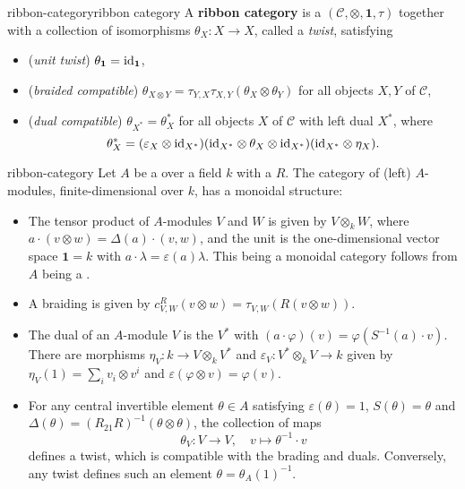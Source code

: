 \begin{topic}{ribbon-category}{ribbon category}
    A \textbf{ribbon category} is a   $(\mathcal{C}, \otimes, \textbf{1}, \tau)$ together with a collection of isomorphisms $\theta_X \colon X \to X$, called a \textit{twist}, satisfying
    \begin{itemize}
        \item (\textit{unit twist}) $\theta_\textbf{1} = \textup{id}_\textbf{1}$,
        \item (\textit{braided compatible}) $\theta_{X \otimes Y} = \tau_{Y, X} \tau_{X, Y} (\theta_X \otimes \theta_Y)$ for all objects $X, Y$ of $\mathcal{C}$,
        \item (\textit{dual compatible}) $\theta_{X^*} = \theta_X^*$ for all objects $X$ of $\mathcal{C}$ with left dual $X^*$, where
        \[ \theta_X^* = (\varepsilon_X \otimes \textup{id}_{X^*}) (\textup{id}_{X^*} \otimes \theta_X \otimes \textup{id}_{X^*}) (\textup{id}_{X^*} \otimes \eta_X) . \]
    \end{itemize}
\end{topic}

\begin{example}{ribbon-category}
    Let $A$ be a  over a field $k$ with a  $R$. The category of (left) $A$-modules, finite-dimensional over $k$, has a monoidal structure:
    \begin{itemize}
        \item The tensor product of $A$-modules $V$ and $W$ is given by $V \otimes_k W$, where $a \cdot (v \otimes w) = \Delta(a) \cdot (v, w)$, and the unit is the one-dimensional vector space $\textbf{1} = k$ with $a \cdot \lambda = \varepsilon(a) \lambda$. This being a monoidal category follows from $A$ being a .
        \item A braiding is given by $c_{V, W}^R(v \otimes w) = \tau_{V, W}(R (v \otimes w))$.
        \item The dual of an $A$-module $V$ is the  $V^*$ with $(a \cdot \varphi)(v) = \varphi(S^{-1}(a) \cdot v)$. There are morphisms $\eta_V \colon k \to V \otimes_k V^*$ and $\varepsilon_V \colon V^* \otimes_k V \to k$ given by $\eta_V(1) = \sum_i v_i \otimes v^i$ and $\varepsilon(\varphi \otimes v) = \varphi(v)$. 
        \item For any central invertible element $\theta \in A$ satisfying $\varepsilon(\theta) = 1$, $S(\theta) = \theta$ and $\Delta(\theta) = (R_{21} R)^{-1} (\theta \otimes \theta)$, the collection of maps
        \[ \theta_V \colon V \to V, \quad v \mapsto \theta^{-1} \cdot v \]
        defines a twist, which is compatible with the brading and duals. Conversely, any twist defines such an element $\theta = \theta_A(1)^{-1}$.
    \end{itemize}
\end{example}

